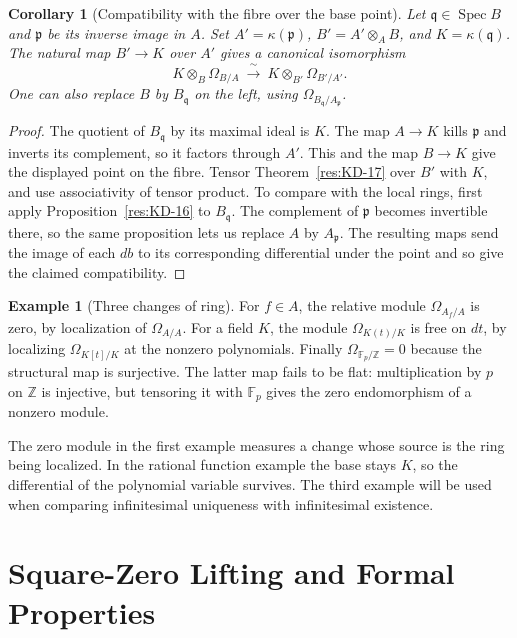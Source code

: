 \documentclass[11pt,oneside,openany]{book}
\newtheorem{corollary}[theorem]{Corollary}
\theoremstyle{definition}
\newtheorem{example}[theorem]{Example}
\theoremstyle{remark}
\begin{document}
\begin{corollary}[Compatibility with the fibre over the base point]\label{res:KD-24}
Let $\mathfrak q\in\operatorname{Spec}B$ and $\mathfrak p$ be its inverse image in $A$. Set $A'=\kappa(\mathfrak p)$, $B'=A'\otimes_A B$, and $K=\kappa(\mathfrak q)$. The natural map $B'\to K$ over $A'$ gives a canonical isomorphism
\[
 K\otimes_B\Omega_{B/A}\ \xrightarrow{\ \sim\ }\
 K\otimes_{B'}\Omega_{B'/A'} .
\]
One can also replace $B$ by $B_{\mathfrak q}$ on the left, using $\Omega_{B_{\mathfrak q}/A_{\mathfrak p}}$.
\end{corollary}

\begin{proof}
The quotient of $B_{\mathfrak q}$ by its maximal ideal is $K$. The map $A\to K$ kills $\mathfrak p$ and inverts its complement, so it factors through $A'$. This and the map $B\to K$ give the displayed point on the fibre. Tensor Theorem~\ref{res:KD-17} over $B'$ with $K$, and use associativity of tensor product. To compare with the local rings, first apply Proposition~\ref{res:KD-16} to $B_{\mathfrak q}$. The complement of $\mathfrak p$ becomes invertible there, so the same proposition lets us replace $A$ by $A_{\mathfrak p}$. The resulting maps send the image of each $db$ to its corresponding differential under the point and so give the claimed compatibility.
\end{proof}

\begin{example}[Three changes of ring]\label{res:KD-25}
For $f\in A$, the relative module $\Omega_{A_f/A}$ is zero, by localization of $\Omega_{A/A}$. For a field $K$, the module $\Omega_{K(t)/K}$ is free on $dt$, by localizing $\Omega_{K[t]/K}$ at the nonzero polynomials. Finally $\Omega_{\mathbb F_p/\mathbb Z}=0$ because the structural map is surjective. The latter map fails to be flat: multiplication by $p$ on $\mathbb Z$ is injective, but tensoring it with $\mathbb F_p$ gives the zero endomorphism of a nonzero module.
\end{example}

The zero module in the first example measures a change whose source is the ring being localized. In the rational function example the base stays $K$, so the differential of the polynomial variable survives. The third example will be used when comparing infinitesimal uniqueness with infinitesimal existence.
\chapter{Square-Zero Lifting and Formal Properties}
\label{ch:lifting}
\end{document}
